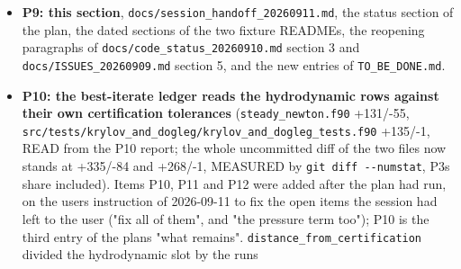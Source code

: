 \documentclass[english,a4paper]{my_memo}
\begin{document}
\begin{itemize}
  the grid-refinement anchor and its remap control are relabelled as
  consistency diagnostics; "permanently uncertified until the operator\textquotesingle s
  order or the grid changes" is withdrawn and quoted where it stood; ISSUES
  3.7\textquotesingle s \texttt{store\_row\_terms} item is struck through and marked RESOLVED by P4,
  and the resolved table gains D1, D2 and D3 with their measured before and
  after. Two test contract errors, both RED before and GREEN after:
  \texttt{steady\_selfconsistent\_residual} assertion 2 read "a hydrodynamic row above
  its tolerance implies \texttt{info\ =\ 2}", which conflates not certified with one
  flag and already failed on the entry text for any budget-limited log
  (\texttt{FAIL\ flag\_of\_carrier\_elem\_newton\ measured=info=1\ reference=info=2} -\textgreater{}
  PASS, with \texttt{wasp\_full\_newton} still PASS and a synthetic \texttt{info\ =\ 0} copy
  still FAILing); and \texttt{relaxation\_drift\_covers\_every\_element} built its
  column by swinging each metal mixing ratio about the reservoir on a fixed
  hydrogen fraction, so its species missed the density the column hands the
  operator by \textbf{1.66042E-02}, which is now \textbf{6.58484E-16} on a column of
  mass fractions that sum to one, the suite going 194/0 to \textbf{195/0} with a
  new row measuring the closure by the code\textquotesingle s own mass policy.
\item
  \textbf{P9: this section}, \texttt{docs/session\_handoff\_20260911.md}, the status section
  of the plan, the dated sections of the two fixture READMEs, the reopening
  paragraphs of \texttt{docs/code\_status\_20260910.md} section 3 and
  \texttt{docs/ISSUES\_20260909.md} section 5, and the new entries of
  \texttt{TO\_BE\_DONE.md}.
\item
  \textbf{P10: the best-iterate ledger reads the hydrodynamic rows against their own
  certification tolerances} (\texttt{steady\_newton.f90} +131/-55,
  \texttt{src/tests/krylov\_and\_dogleg/krylov\_and\_dogleg\_tests.f90} +135/-1, READ from
  the P10 report; the whole uncommitted diff of the two files now stands at
  +335/-84 and +268/-1, MEASURED by \texttt{git\ diff\ -\/-numstat}, P3\textquotesingle s share
  included). Items P10, P11 and P12 were added after the plan had run, on the
  user\textquotesingle s instruction of 2026-09-11 to fix the open items the session had left
  to the user ("fix all of them", and "the pressure term too"); P10 is the
  third entry of the plan\textquotesingle s "what remains".
  \texttt{distance\_from\_certification} divided the hydrodynamic slot by the run\textquotesingle s

\end{itemize}
\end{document}
